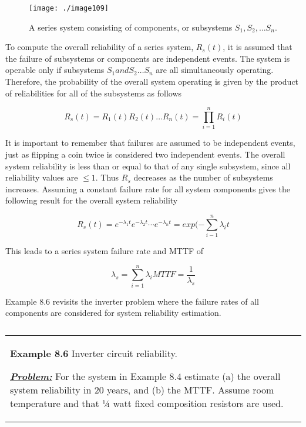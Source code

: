{\begin{figure}
\texttt{[image: ./image109]}
\caption{A series system consisting of components, or subsystems $S_1, S_2, \ldots S_n$.}
\label{figure:seriesSystems}
\end{figure}

To compute the overall reliability of a series system, $R_s(t)$, 
it is assumed that the failure
of subsystems or components are independent events. The system is
operable only if subsystems $S_1 and S_2 \ldots S_n$ are all simultaneously
operating. Therefore, the probability of the overall system operating is
given by the product of reliabilities for all of the subsystems as
follows

\begin{equation}
\label{equ:seriesProbability}
R_s(t) = R_1(t)R_2(t)\ldots R_n(t) = \prod_{i=1}^n R_i(t) 
\end{equation}

It is important to remember that failures are assumed to be independent
events, just as flipping a coin twice is considered two independent
events. The overall system reliability is less than or equal to that of
any single subsystem, since all reliability values are $\leq 1$. Thus
$R_s$ decreases as the number of
subsystems increases. Assuming a constant failure rate for all system
components gives the following result for the overall system reliability

\begin{equation}
\label{equ:seriesProbabilityConstantErrorRate}
R_s(t) = e^{-\lambda_1t}e^{-\lambda_2t}\cdots e^{-\lambda_nt} = exp(-\sum_{i-1}^n \lambda_i t
\end{equation}

This leads to a series system failure rate and MTTF of


\begin{equation}
\label{equ:seriesProbabilityMttf}
\lambda_s = \sum_{i=1}^n \lambda_i
MTTF = \frac{1}{\lambda_s}
\end{equation}

Example 8.6 revisits the inverter problem where the failure rates of all
components are considered for system reliability estimation.


\begin{table}
\caption{}
\label{table:<context>}
\begin{tabular}{|m{15cm}|}
\textbf{\hfill\break Example 8.6} 
Inverter circuit reliability.

\emph{\textbf{\ul{Problem:}}} For the system in Example 8.4 estimate (a)
the overall system reliability in 20 years, and (b) the MTTF. Assume
room temperature and that ¼ watt fixed composition resistors are used.


\end{tabular}
\end{table}}
